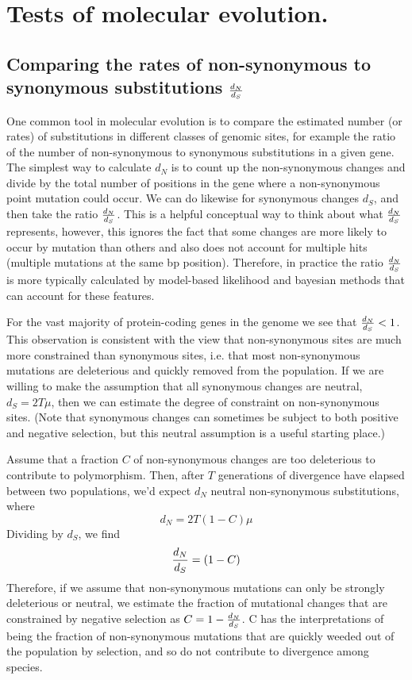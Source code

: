 \section{Tests of molecular evolution.}

\subsection{Comparing the rates of non-synonymous to synonymous
substitutions $\frac{d_N}{d_S}$}
One common tool in molecular evolution is to compare the estimated number (or rates) of substitutions in different classes of genomic sites, for example the ratio of the number of non-synonymous to synonymous substitutions in a given gene. The simplest way to calculate $d_N$ is to 
count up the non-synonymous changes and divide by the total number of
positions in the gene where a non-synonymous point mutation could occur. We
can do likewise for synonymous changes $d_S$, and then take the ratio $\frac{d_N}{d_S}$. This is a helpful
conceptual way to think about what $\frac{d_N}{d_S}$ represents, however, this
ignores the fact that some changes are more likely to occur by
mutation than others and also does not account for multiple hits (multiple mutations at the same bp position). Therefore, in
practice the ratio $\frac{d_N}{d_S}$ is more typically calculated by model-based
likelihood and bayesian methods
that can account for these features. 

For the vast majority of protein-coding genes in the genome we see that $\frac{d_N}{d_S} < 1$. This observation is consistent with the view
that non-synonymous sites are much more constrained than synonymous sites, i.e. that most non-synonymous mutations are deleterious and quickly removed from the population. If we are willing to make the assumption that all synonymous changes are
neutral, $d_S=2T \mu$, then we can estimate the degree of constraint on non-synonymous sites. (Note that synonymous changes can sometimes be subject to
both positive and negative selection, but this neutral assumption is a useful starting place.) 

Assume that a fraction $C$ of non-synonymous changes are too
deleterious to contribute to polymorphism. Then, after $T$ generations of divergence have
elapsed between two populations, we'd expect $d_N$ neutral non-synonymous substitutions, where
\begin{equation}
d_N = 2T (1-C) \mu  
\end{equation}
Dividing by $d_S$, we find
\begin{equation} 
\frac{d_N}{d_S} = (1-C) 
\end{equation}
Therefore, if we assume that non-synonymous mutations can only be
strongly deleterious or neutral, we estimate the fraction of mutational changes that
are constrained by negative selection as $C= 1- \frac{d_N}{d_S}$. C has the
interpretations of being the fraction of non-synonymous mutations that are quickly weeded out of the population by selection, and so do not contribute to divergence among species. 

